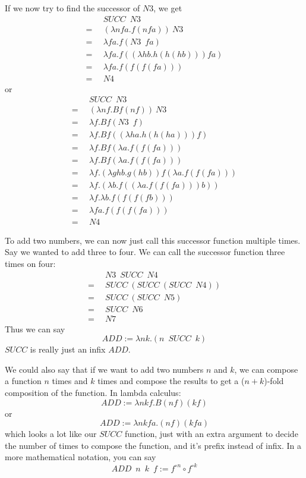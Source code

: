 \documentclass[11pt]{article}
\begin{document}
If we now try to find the successor of \(N3\), we get
\begin{align*}
	&SUCC\enspace N3\\
	=\enspace&(\lambda nfa.f(nfa))\:N3\\
	=\enspace&\lambda fa.f(N3\enspace fa)\\
	=\enspace&\lambda fa.f((\lambda hb.h(h(hb)))fa)\\
	=\enspace&\lambda fa.f(f(f(fa)))\\
	=\enspace&N4
\end{align*}
or
\begin{align*}
	&SUCC\enspace N3\\
	=\enspace&(\lambda nf.Bf(nf))\:N3\\
	=\enspace&\lambda f.Bf(N3\enspace f)\\
	=\enspace&\lambda f.Bf((\lambda ha.h(h(ha)))f)\\
	=\enspace&\lambda f.Bf(\lambda a.f(f(fa)))\\
	=\enspace&\lambda f.Bf(\lambda a.f(f(fa)))\\
	=\enspace&\lambda f.(\lambda ghb.g(hb))f(\lambda a.f(f(fa)))\\
	=\enspace&\lambda f.(\lambda b.f((\lambda a.f(f(fa)))b))\\
	=\enspace&\lambda f.\lambda b.f(f(f(fb)))\\
	=\enspace&\lambda fa.f(f(f(fa)))\\
	=\enspace&N4
\end{align*}

To add two numbers, we can now just call this successor function multiple
times. Say we wanted to add three to four. We can call the successor function
three times on four:
\begin{align*}
	&N3\enspace SUCC\enspace N4\\
	=\enspace&SUCC\:(SUCC\:(SUCC\enspace N4))\\
	=\enspace&SUCC\:(SUCC\enspace N5)\\
	=\enspace&SUCC\enspace N6\\
	=\enspace&N7
\end{align*}
Thus we can say
\[ADD:=\lambda nk.(n\enspace SUCC\enspace k)\]
\(SUCC\) is really just an infix \(ADD\).

We could also say that if we want to add two numbers \(n\) and \(k\), we can
compose a function \(n\) times and \(k\) times and compose the results to get a
(\(n+k\))-fold composition of the function. In lambda calculus:
\[ADD:=\lambda nkf.B(nf)(kf)\]
or
\[ADD:=\lambda nkfa.(nf)(kfa)\]
which looks a lot like our \(SUCC\) function, just with an extra argument to
decide the number of times to compose the function, and it's prefix instead of
infix. In a more mathematical notation, you can say
\[ADD\enspace n\enspace k\enspace f := f^{\circ n}\circ f^{\circ k}\]
\end{document}
